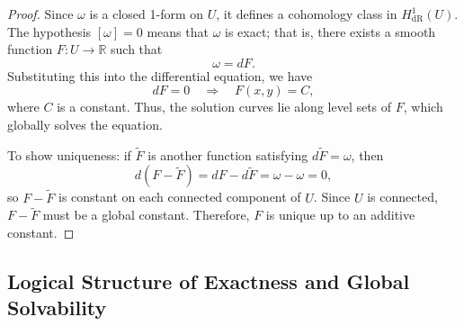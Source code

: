 \documentclass{amsart}
\theoremstyle{definition}
\theoremstyle{remark}
\numberwithin{equation}{section}
\begin{document}
\begin{proof}
Since \( \omega \) is a closed 1-form on \( U \), it defines a cohomology class in \( H^1_{\mathrm{dR}}(U) \). The hypothesis \( [\omega] = 0 \) means that \( \omega \) is exact; that is, there exists a smooth function \( F : U \to \mathbb{R} \) such that
\[
\omega = dF.
\]
Substituting this into the differential equation, we have
\[
dF = 0 \quad \Rightarrow \quad F(x, y) = C,
\]
where \( C \) is a constant. Thus, the solution curves lie along level sets of \( F \), which globally solves the equation.

To show uniqueness: if \( \tilde{F} \) is another function satisfying \( d\tilde{F} = \omega \), then
\[
d(F - \tilde{F}) = dF - d\tilde{F} = \omega - \omega = 0,
\]
so \( F - \tilde{F} \) is constant on each connected component of \( U \). Since \( U \) is connected, \( F - \tilde{F} \) must be a global constant. Therefore, \( F \) is unique up to an additive constant.
\end{proof}
\subsection*{Logical Structure of Exactness and Global Solvability}
\end{document}

